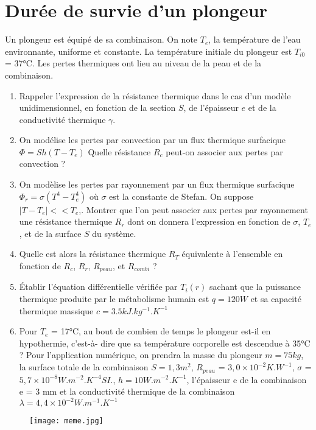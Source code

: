 \documentclass{article}
\begin{document}
\section{Durée de survie d'un plongeur }
Un plongeur est équipé de sa combinaison.
On note $T_e$, la température de l’eau environnante, uniforme et constante. La température initiale du plongeur est $T_{i0}$ = 37°C. Les pertes thermiques ont lieu au niveau de la peau et de la
combinaison. 
\begin{enumerate}
    \item Rappeler l’expression de la résistance thermique dans le cas d’un modèle unidimensionnel,
en fonction de la section $S$, de l’épaisseur $e$ et de la conductivité thermique $\gamma$.
\item On modélise les pertes par convection par un flux thermique surfacique $\Phi = Sh(T-T_e)$
Quelle résistance $R_c$ peut-on associer aux pertes par convection ? 
\item  On modèlise les pertes par rayonnement par un flux thermique surfacique $\Phi_r = \sigma (T^4 - T_e^4)$
où $\sigma$ est la constante de Stefan. On suppose $|T-T_e|<<T_e$,. Montrer que l’on peut associer aux
pertes par rayonnement une résistance thermique $R_r$ dont on donnera l’expression en fonction
de $\sigma$, $T_e$, et de la surface $S$ du système. 
\item  Quelle est alors la résistance thermique $R_T$ équivalente à l’ensemble en fonction de $R_c$, $R_r$, $R_{peau}$, et $R_{combi}$ ?
\item  Établir l’équation différentielle vérifiée par $T_i(r)$ sachant que la puissance thermique produite par le métabolisme humain est $q = 120 W$ et sa capacité thermique massique $c = 3.5 kJ. kg^{-1}.K^{-1}$
\item Pour $T_e$ = 17°C, au bout de combien de temps le plongeur est-il en hypothermie, c’est-à- dire que sa température corporelle est descendue à 35°C ? Pour l’application numérique, on prendra la masse du plongeur $ m = 75 kg$, la surface totale de la combinaison $S = 1,3 m^2$, $R_{peau}$ = $3,0 \times 10^{-2} K.W^{-1}$, $\sigma$ =$5,7 \times 10^{-8} W.m^{-2} . K^{-4} SI.$,  $h = 10  W.m^{-2}.K^{-1}$, l’épaisseur e de la combinaison e = 3 mm et la conductivité thermique de la combinaison $\lambda = 4,4 \times 10^{-2} W.m^{-1}.K^{-1}$\\[2cm]


\end{enumerate}


\begin{figure}[h]
  \centering
  \texttt{[image: meme.jpg]}
\end{figure}
\end{document}
